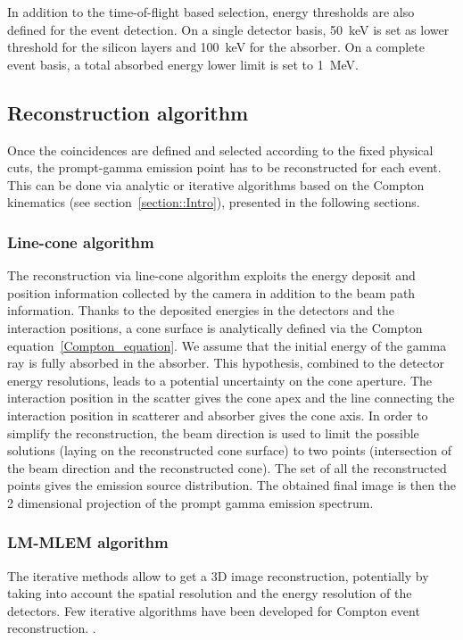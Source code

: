 In addition to the time-of-flight based selection, energy thresholds are also defined for the event detection. On a single detector basis, 50~keV is set as lower threshold for the silicon layers and 100~keV for the absorber. On a complete event basis, a total absorbed energy lower limit is set to 1~MeV.

\subsection{Reconstruction algorithm}

Once the coincidences are defined and selected according to the fixed physical cuts, the prompt-gamma emission point has to be reconstructed for each event. This can be done via analytic or iterative algorithms based on the Compton kinematics (see section~\ref{section::Intro}), presented in the following sections.


\subsubsection{Line-cone algorithm}
The reconstruction via line-cone algorithm exploits the energy deposit and position information collected by the camera in addition to the beam path information. Thanks to the deposited energies in the detectors and the interaction positions, a cone surface is analytically defined via the Compton equation~\ref{Compton_equation}.
\newline
We assume that the initial energy of the gamma ray is fully absorbed in the absorber. This hypothesis, combined to the detector energy resolutions, leads to a potential uncertainty on the cone aperture. The interaction position in the scatter gives the cone apex and the line connecting the interaction position in scatterer and absorber gives the cone axis. In order to simplify the reconstruction, the beam direction is used to limit the possible solutions (laying on the reconstructed cone surface) to two points (intersection of the beam direction and the reconstructed cone). The set of all the reconstructed points gives the emission source distribution. The obtained final image is then the 2 dimensional projection of the prompt gamma emission spectrum. 

\subsubsection{LM-MLEM algorithm}	

The iterative methods allow to get a 3D image reconstruction, potentially by taking into account the spatial resolution and the energy resolution of the detectors. Few iterative algorithms have been developed for Compton event reconstruction. \cite{schone_common_2010, zoglauer_design_2011,gillam_compton_2011,mackin_evaluation_2012,lojacono_low_2013}.

